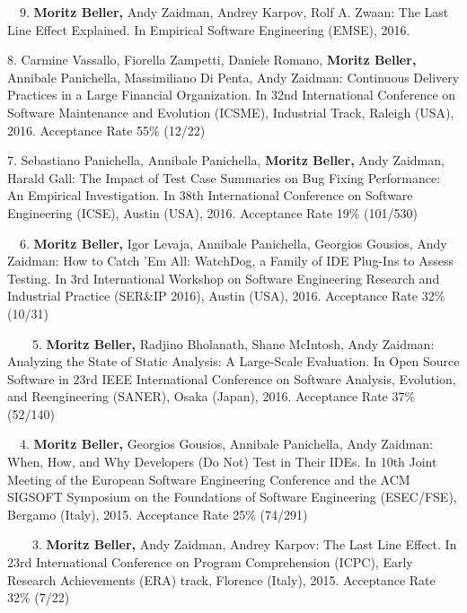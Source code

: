 \begin{etaremune}
{\item[\faFileTextO~~9.] \textbf{Moritz Beller,} Andy Zaidman, Andrey Karpov, Rolf A. Zwaan: The
  Last Line Effect Explained. In Empirical Software Engineering (EMSE), 2016.

\item[8.] Carmine Vassallo, Fiorella Zampetti, Daniele Romano, \textbf{Moritz Beller,} Annibale
  Panichella, Massimiliano Di Penta, Andy Zaidman: Continuous Delivery Practices in a Large
  Financial Organization. In 32nd International Conference on Software Maintenance and Evolution
  (ICSME), Industrial Track, Raleigh (USA), 2016. Acceptance Rate 55\% (12/22)

\item[7.] Sebastiano Panichella, Annibale Panichella, \textbf{Moritz Beller,} Andy Zaidman, Harald
  Gall: The Impact of Test Case Summaries on Bug Fixing Performance: An Empirical Investigation. In
  38th International Conference on Software Engineering (ICSE), Austin (USA), 2016. Acceptance Rate
  19\% (101/530)

\item[\faFileTextO~~6.] \textbf{Moritz Beller,} Igor Levaja, Annibale Panichella, Georgios Gousios,
  Andy Zaidman: How to Catch ’Em All: WatchDog, a Family of IDE Plug-Ins to Assess Testing. In 3rd
  International Workshop on Software Engineering Research and Industrial Practice (SER\&IP 2016),
  Austin (USA), 2016. Acceptance Rate 32\% (10/31)

\item[\faTrophy~~\faFileTextO~~5.] \textbf{Moritz Beller,} Radjino Bholanath, Shane McIntosh, Andy
  Zaidman: Analyzing the State of Static Analysis: A Large-Scale Evaluation. In Open Source
  Software in 23rd IEEE International Conference on Software Analysis, Evolution, and Reengineering
  (SANER), Osaka (Japan), 2016. Acceptance Rate 37\% (52/140)

\item[\faFileTextO~~4.] \textbf{Moritz Beller,} Georgios Gousios, Annibale Panichella, Andy
  Zaidman: When, How, and Why Developers (Do Not) Test in Their IDEs. In 10th Joint Meeting of the
  European Software Engineering Conference and the ACM SIGSOFT Symposium on the Foundations of
  Software Engineering (ESEC/FSE), Bergamo (Italy), 2015. Acceptance Rate 25\% (74/291)

\item[\faTrophy~~\faFileTextO~~3.] \textbf{Moritz Beller,} Andy Zaidman, Andrey Karpov: The Last
  Line Effect. In 23rd International Conference on Program Comprehension (ICPC), Early Research
  Achievements (ERA) track, Florence (Italy), 2015. Acceptance Rate 32\% (7/22)

}
\end{etaremune}
